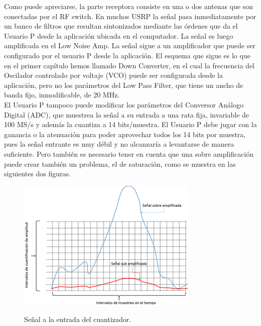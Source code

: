 Como puede apreciarse, la parte receptora consiste en una o dos antenas que son conectadas por el RF switch. En muchos USRP la señal pasa inmediatamente por un banco de filtros que resultan sintonizados mediante las órdenes que da el Usuario P desde la aplicación ubicada en el computador. La señal es luego amplificada en el Low Noise Amp. La señal sigue a un amplificador que puede ser configurado por el usuario P desde la aplicación. El esquema que sigue es lo que en el primer capítulo hemos llamado Down Converter, en el cual la frecuencia del Oscilador controlado por voltaje (VCO) puede ser configurada desde la aplicación, pero no los parámetros del Low Pass Filter, que tiene un ancho de banda fijo, inmodificable, de 20 MHz. \\
El Usuario P tampoco puede modificar los parámetros del Conversor Análogo Digital (ADC), que muestrea la señal a su entrada a una rata fija, invariable de 100 MS/s y además la cuantiza a 14 bits/muestra. El Usuario P debe jugar con la ganancia o la atenuación para poder aprovechar todos los 14 bits por muestra, pues la señal entrante es muy débil y no alcanzaría a levantarse de manera suficiente. Pero también es necesario tener en cuenta que una sobre amplificación puede crear también un problema, el de saturación, como se muestra en las siguientes dos figuras.

\begin{figure}[h!]
	\captionsetup{justification = raggedright, singlelinecheck = false}
	\caption{Señal a la entrada del cuantizador.} 
	\centering
	\includegraphics[scale=1]{Imagenes/Senal-entrada.png}
	\label{fig:Senal-entrada}
\end{figure}


